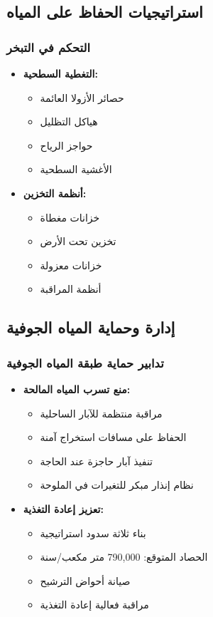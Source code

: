 \subsection{استراتيجيات الحفاظ على المياه}

\subsubsection{التحكم في التبخر}
\begin{itemize}
    \item \textbf{التغطية السطحية:}
    \begin{itemize}
        \item حصائر الأزولا العائمة
        \item هياكل التظليل
        \item حواجز الرياح
        \item الأغشية السطحية
    \end{itemize}
    
    \item \textbf{أنظمة التخزين:}
    \begin{itemize}
        \item خزانات مغطاة
        \item تخزين تحت الأرض
        \item خزانات معزولة
        \item أنظمة المراقبة
    \end{itemize}
\end{itemize}

\subsection{إدارة وحماية المياه الجوفية}

\subsubsection{تدابير حماية طبقة المياه الجوفية}
\begin{itemize}
    \item \textbf{منع تسرب المياه المالحة:}
    \begin{itemize}
        \item مراقبة منتظمة للآبار الساحلية
        \item الحفاظ على مسافات استخراج آمنة
        \item تنفيذ آبار حاجزة عند الحاجة
        \item نظام إنذار مبكر للتغيرات في الملوحة
    \end{itemize}
    
    \item \textbf{تعزيز إعادة التغذية:}
    \begin{itemize}
        \item بناء ثلاثة سدود استراتيجية
        \item الحصاد المتوقع: 790,000 متر مكعب/سنة
        \item صيانة أحواض الترشيح
        \item مراقبة فعالية إعادة التغذية
    \end{itemize}
\end{itemize}

